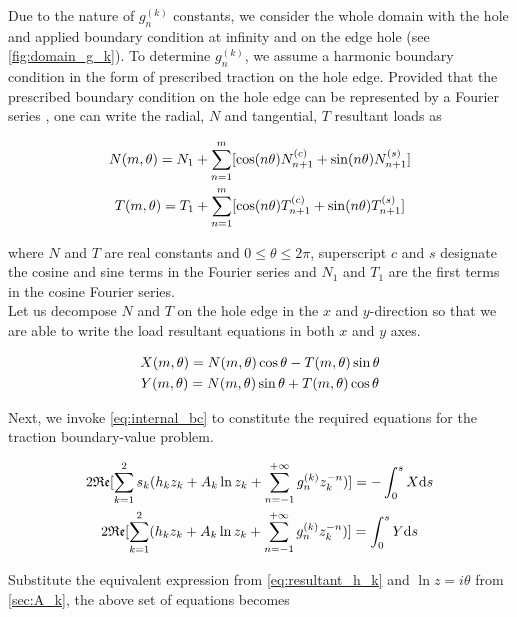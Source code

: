 \documentclass{article}
\begin{document}
Due to the nature of $g_n^{(k)}$ constants, we consider the whole domain with the hole and applied boundary condition at infinity and on the edge hole (see \cref{fig:domain_g_k}). To determine $g_n^{(k)}$, we assume a harmonic boundary condition in the form of prescribed traction on the hole edge. Provided that the prescribed boundary condition on the hole edge can be represented by a Fourier series \cite{Koussios2009}, one can write the radial, $N$ and tangential, $T$ resultant loads as 

\begin{gather}
    N(m, \theta) = N_1 + \sum_{n=1}^{m}[\cos(n\theta) N_{n+1}^{(c)} + \sin(n\theta) N_{n+1}^{(s)}] \notag \\
    T(m , \theta) = T_1 + \sum_{n=1}^{m}[\cos(n\theta) T_{n+1}^{(c)} + \sin(n\theta) T_{n+1}^{(s)}]
    \label{eq:harmonic_load}
\end{gather}

where $N$ and $T$ are real constants and $0 \leq \theta \leq 2\pi$, superscript $c$ and $s$ designate the cosine and sine terms in the Fourier series and $N_1$ and $T_1$ are the first terms in the cosine Fourier series. \\

Let us decompose $N$ and $T$ on the hole edge in the $x$ and $y$-direction so that we are able to write the load resultant equations in both $x$ and $y$ axes.

\begin{gather}
    X(m, \theta) = N(m, \theta) \cos\theta - T(m, \theta) \sin\theta \notag \\
    Y(m, \theta) = N(m, \theta) \sin\theta + T(m, \theta) \cos\theta
    \label{eq:decompose_N_T}
\end{gather}

Next, we invoke \cref{eq:internal_bc} to constitute the required equations for the traction boundary-value problem. 

\begin{gather*}
    2 \mathfrak{Re}[\sum_{k=1}^{2} s_k (h_k z_k + A_k \ln{z_k} + \displaystyle\sum_{n=-1}^{+\infty} g_n^{(k)} z_k^{-n}) ] = -\int_{0}^{s}{X \mathrm{d}s}  \notag \\
    2 \mathfrak{Re}[\sum_{k=1}^{2} (h_k z_k + A_k \ln{z_k} + \displaystyle\sum_{n=-1}^{+\infty} g_n^{(k)} z_k^{-n}) ] = \int_{0}^{s}{Y \mathrm{d}s}
\end{gather*}

Substitute the equivalent expression from \cref{eq:resultant_h_k} and $\ln z=i\theta$ from \cref{sec:A_k}, the above set of equations becomes
\end{document}

